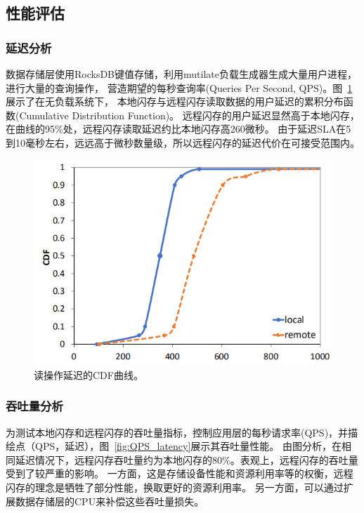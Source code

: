 \subsection{性能评估}

\subsubsection{延迟分析}
数据存储层使用RocksDB键值存储，利用mutilate负载生成器\cite{leverich2014mutilate}生成大量用户进程，进行大量的查询操作，
营造期望的每秒查询率(Queries Per Second, QPS)。图~\ref{fig:read_latency_CDF}展示了在无负载系统下，
本地闪存与远程闪存读取数据的用户延迟的累积分布函数(Cumulative Distribution Function)。
远程闪存的用户延迟显然高于本地闪存，在曲线的95\%处，远程闪存读取延迟约比本地闪存高260微秒。
由于延迟SLA在5到10毫秒左右，远远高于微秒数量级，所以远程闪存的延迟代价在可接受范围内。

\begin{figure}
\centering
\includegraphics[scale=0.8]{Figures/storage/read_latency_CDF.jpg}
\decoRule
\caption{读操作延迟的CDF曲线。}
\label{fig:read_latency_CDF}
\end{figure}

\subsubsection{吞吐量分析}
为测试本地闪存和远程闪存的吞吐量指标，控制应用层的每秒请求率(QPS)，并描绘点（QPS，延迟），图~\ref{fig:QPS_latency}展示其吞吐量性能。
由图分析，在相同延迟情况下，远程闪存吞吐量约为本地闪存的80\%。表观上，远程闪存的吞吐量受到了较严重的影响。
一方面，这是存储设备性能和资源利用率等的权衡，远程闪存的理念是牺牲了部分性能，换取更好的资源利用率。
另一方面，可以通过扩展数据存储层的CPU来补偿这些吞吐量损失。

